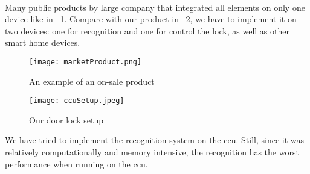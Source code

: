\paragraph{}
Many public products by large company that integrated all elements on only one device like in ~\ref{fig:publishedProd}. Compare with our product in ~\ref{fig:ccuSetup}, we have to implement it on two devices: one for recognition and one for control the lock, as well as other smart home devices.

\begin{figure}[H]
    \centering
    \texttt{[image: marketProduct.png]}
    \caption{An example of an on-sale product}
    \label{fig:publishedProd}
\end{figure}

\begin{figure}
    \centering
    \texttt{[image: ccuSetup.jpeg]}
    \caption{Our door lock setup}
    \label{fig:ccuSetup}
\end{figure}

We have tried to implement the recognition system on the \acrshort{ccu}. Still, since it was relatively computationally and memory intensive, the recognition has the worst performance when running on the \acrshort{ccu}.

